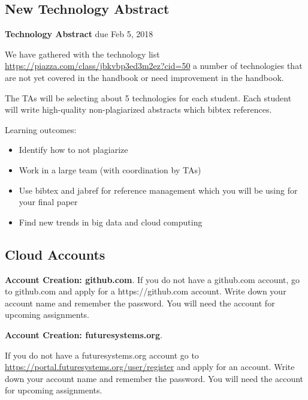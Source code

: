 \subsection{New Technology Abstract}
\label{E:616-new-tech-abstract}

\begin{exercise} {\bf Technology Abstract} due Feb 5, 2018

We have gathered with the technology list \url{https://piazza.com/class/jbkvbp3ed3m2ez?cid=50} a number of technologies that are not yet covered in the handbook or
need improvement in the handbook.

The TAs will be selecting about 5 technologies for each student. Each
student will write high-quality non-plagiarized abstracts which bibtex
references.
 
Learning outcomes:

\begin{itemize}

\item Identify how to not plagiarize
\item Work in a large team (with coordination by TAs)
\item Use bibtex and jabref for reference management which you will be using for your final paper
\item Find new trends in big data and cloud computing

\end{itemize}

\end{exercise}

\subsection{Cloud Accounts}

\begin{exercise}

  {\bf Account Creation: github.com}. If you do not have a github.com
  account, go to github.com and apply for a https://github.com
  account. Write down your account name and remember the password. You
  will need the account for upcoming assignments.

\end{exercise}

\begin{exercise}

  {\bf Account Creation: futuresystems.org}. 
  
  If you do not have a
  futuresystems.org account go to
  \url{https://portal.futuresystems.org/user/register} and apply for an
  account. Write down your account name and remember the password. You
  will need the account for upcoming assignments.

\end{exercise}

